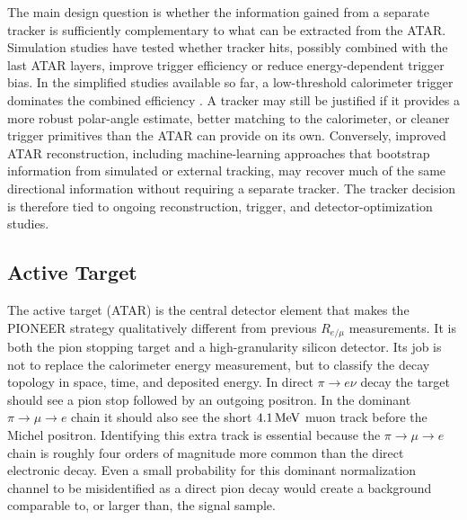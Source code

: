The main design question is whether the information gained from a separate
tracker is sufficiently complementary to what can be extracted from the ATAR.
Simulation studies have tested whether tracker hits, possibly combined with
the last ATAR layers, improve trigger efficiency or reduce energy-dependent
trigger bias. In the simplified studies available so far, a low-threshold
calorimeter trigger dominates the combined efficiency
\cite{rohe_track_trigger_2026,schwendimann_spa_tracker_2026}. A tracker may
still be justified if it provides a more robust polar-angle estimate, better
matching to the calorimeter, or cleaner trigger primitives than the ATAR can
provide on its own. Conversely, improved ATAR reconstruction, including
machine-learning approaches that bootstrap information from simulated or
external tracking, may recover much of the same directional information
without requiring a separate tracker. The tracker decision is therefore tied
to ongoing reconstruction, trigger, and detector-optimization studies.

\subsection{Active Target}
\label{subsec:detector-overview-atar}

The active target (ATAR) is the central detector element that makes the
PIONEER strategy qualitatively different from previous \(R_{e/\mu}\)
measurements. It is both the pion stopping target and a high-granularity
silicon detector. Its job is not to replace the calorimeter energy
measurement, but to classify the decay topology in space, time, and deposited
energy. In direct
\(\pi\to e\nu\) decay the target should see a pion stop followed by an
outgoing positron. In the dominant \(\pi\to\mu\to e\) chain it should also see
the short \(\SI{4.1}{\mega\electronvolt}\) muon track before the Michel
positron. Identifying this extra track is essential because the
\(\pi\to\mu\to e\) chain is roughly four orders of magnitude more common than
the direct electronic decay. Even a small probability for this dominant
normalization channel to be misidentified as a direct pion decay would create
a background comparable to, or larger than, the signal sample.

